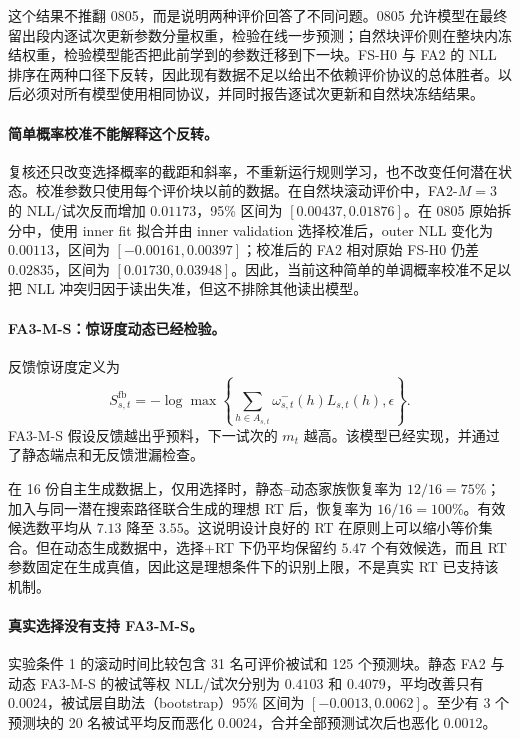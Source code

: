 这个结果不推翻 0805，而是说明两种评价回答了不同问题。0805 允许模型在最终留出段内逐试次更新参数分量权重，检验在线一步预测；自然块评价则在整块内冻结权重，检验模型能否把此前学到的参数迁移到下一块。FS-H0 与 FA2 的 NLL 排序在两种口径下反转，因此现有数据不足以给出不依赖评价协议的总体胜者。以后必须对所有模型使用相同协议，并同时报告逐试次更新和自然块冻结结果。

\paragraph{简单概率校准不能解释这个反转。}
复核还只改变选择概率的截距和斜率，不重新运行规则学习，也不改变任何潜在状态。校准参数只使用每个评价块以前的数据。在自然块滚动评价中，FA2-$M=3$ 的 NLL/试次反而增加 $0.01173$，95\% 区间为 $[0.00437,0.01876]$。在 0805 原始拆分中，使用 inner fit 拟合并由 inner validation 选择校准后，outer NLL 变化为 $0.00113$，区间为 $[-0.00161,0.00397]$；校准后的 FA2 相对原始 FS-H0 仍差 $0.02835$，区间为 $[0.01730,0.03948]$。因此，当前这种简单的单调概率校准不足以把 NLL 冲突归因于读出失准，但这不排除其他读出模型。

\paragraph{FA3-M-S：惊讶度动态已经检验。}
反馈惊讶度定义为
\begin{equation}
S^{\mathrm{fb}}_{s,t}
=-\log\max\left\{
\sum_{h\in A_{s,t}}\omega^-_{s,t}(h)L_{s,t}(h),\epsilon
\right\}.
\label{eq:model0806-feedback-surprise}
\end{equation}
FA3-M-S 假设反馈越出乎预料，下一试次的 $m_t$ 越高。该模型已经实现，并通过了静态端点和无反馈泄漏检查。

在 16 份自主生成数据上，仅用选择时，静态--动态家族恢复率为 $12/16=75\%$；加入与同一潜在搜索路径联合生成的理想 RT 后，恢复率为 $16/16=100\%$。有效候选数平均从 $7.13$ 降至 $3.55$。这说明设计良好的 RT 在原则上可以缩小等价集合。但在动态生成数据中，选择+RT 下仍平均保留约 $5.47$ 个有效候选，而且 RT 参数固定在生成真值，因此这是理想条件下的识别上限，不是真实 RT 已支持该机制。

\paragraph{真实选择没有支持 FA3-M-S。}
实验条件 1 的滚动时间比较包含 31 名可评价被试和 125 个预测块。静态 FA2 与动态 FA3-M-S 的被试等权 NLL/试次分别为 $0.4103$ 和 $0.4079$，平均改善只有 $0.0024$，被试层自助法（bootstrap）95\% 区间为 $[-0.0013,0.0062]$。至少有 3 个预测块的 20 名被试平均反而恶化 $0.0024$，合并全部预测试次后也恶化 $0.0012$。

